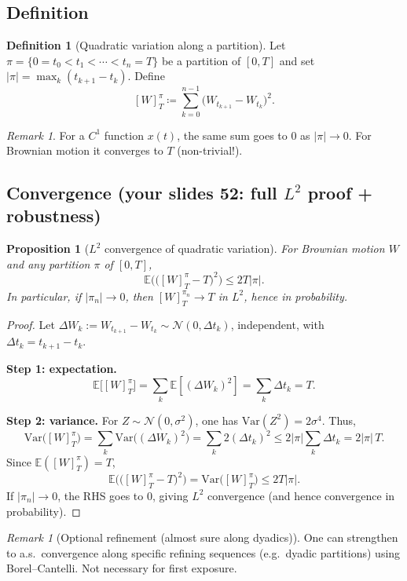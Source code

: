 \documentclass[11pt]{article}
\newtheorem{proposition}[theorem]{Proposition}
\theoremstyle{definition}
\newtheorem{definition}[theorem]{Definition}
\theoremstyle{remark}
\newtheorem{remark}[theorem]{Remark}
\newcommand{\E}{\mathbb{E}}
\newcommand{\Var}{\mathrm{Var}}
\begin{document}
\subsection{Definition}

\begin{definition}[Quadratic variation along a partition]
Let $\pi=\{0=t_0<t_1<\cdots<t_n=T\}$ be a partition of $[0,T]$ and set $|\pi|=\max_k(t_{k+1}-t_k)$.
Define
\[
[W]^{\pi}_T \coloneqq \sum_{k=0}^{n-1}\big(W_{t_{k+1}}-W_{t_k}\big)^2.
\]
\end{definition}

\begin{remark}
For a $C^1$ function $x(t)$, the same sum goes to $0$ as $|\pi|\to0$.
For Brownian motion it converges to $T$ (non-trivial!).
\end{remark}

\subsection{Convergence (your slides 52: full $L^2$ proof + robustness)}

\begin{proposition}[$L^2$ convergence of quadratic variation]
For Brownian motion $W$ and any partition $\pi$ of $[0,T]$,
\[
\E\Big(\big([W]^{\pi}_T-T\big)^2\Big)\le 2T|\pi|.
\]
In particular, if $|\pi_n|\to0$, then $[W]^{\pi_n}_T\to T$ in $L^2$, hence in probability.
\end{proposition}

\begin{proof}
Let $\Delta W_k:=W_{t_{k+1}}-W_{t_k}\sim\mathcal{N}(0,\Delta t_k)$, independent, with $\Delta t_k=t_{k+1}-t_k$.

\noindent\textbf{Step 1: expectation.}
\[
\E\big[[W]^{\pi}_T\big]=\sum_k \E[(\Delta W_k)^2]=\sum_k \Delta t_k=T.
\]

\noindent\textbf{Step 2: variance.}
For $Z\sim\mathcal{N}(0,\sigma^2)$, one has $\Var(Z^2)=2\sigma^4$.
Thus,
\[
\Var\big([W]^{\pi}_T\big)
=\sum_k \Var\big((\Delta W_k)^2\big)
=\sum_k 2(\Delta t_k)^2
\le 2|\pi|\sum_k \Delta t_k
=2|\pi|\,T.
\]
Since $\E([W]^{\pi}_T)=T$,
\[
\E\Big(\big([W]^{\pi}_T-T\big)^2\Big)=\Var\big([W]^{\pi}_T\big)\le 2T|\pi|.
\]
If $|\pi_n|\to0$, the RHS goes to $0$, giving $L^2$ convergence (and hence convergence in probability).
\end{proof}

\begin{remark}[Optional refinement (almost sure along dyadics)]
One can strengthen to a.s.\ convergence along specific refining sequences (e.g.\ dyadic partitions) using Borel--Cantelli.
Not necessary for first exposure.
\end{remark}
\end{document}
